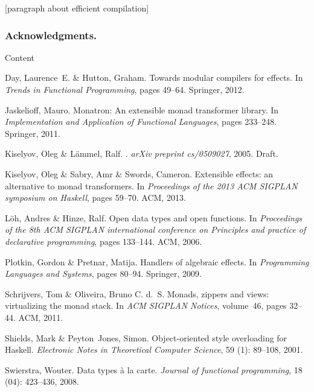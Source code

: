 \documentclass[runningheads,a4paper]{llncs}
\newcommand{\todo}[1]{[{\color{blue}#1}]}
\begin{document}
\todo{paragraph about efficient compilation}

\subsubsection*{Acknowledgments.} Content

\begin{thebibliography}{4}

Day, Laurence~E. \& Hutton, Graham.
\newblock Towards modular compilers for effects.
\newblock In \emph{Trends in Functional Programming}, pages 49--64. Springer,
  2012.

Jaskelioff, Mauro.
\newblock Monatron: An extensible monad transformer library.
\newblock In \emph{Implementation and Application of Functional Languages},
  pages 233--248. Springer, 2011.
  
  Kiselyov, Oleg \& L{\"a}mmel, Ralf.
  .
  \newblock \emph{arXiv preprint cs/0509027}, 2005.
  \newblock Draft.

Kiselyov, Oleg \& Sabry, Amr \& Swords, Cameron.
\newblock Extensible effects: an alternative to monad transformers.
\newblock In \emph{Proceedings of the 2013 ACM SIGPLAN symposium on Haskell},
  pages 59--70. ACM, 2013.

L{\"o}h, Andres \& Hinze, Ralf.
\newblock Open data types and open functions.
\newblock In \emph{Proceedings of the 8th ACM SIGPLAN international conference
  on Principles and practice of declarative programming}, pages 133--144. ACM,
  2006.

Plotkin, Gordon \& Pretnar, Matija.
\newblock Handlers of algebraic effects.
\newblock In \emph{Programming Languages and Systems}, pages 80--94. Springer,
  2009.

Schrijvers, Tom \& Oliveira, Bruno C. d.~S.
\newblock Monads, zippers and views: virtualizing the monad stack.
\newblock In \emph{ACM SIGPLAN Notices}, volume~46, pages 32--44. ACM, 2011.

Shields, Mark \& Peyton~Jones, Simon.
\newblock Object-oriented style overloading for Haskell.
\newblock \emph{Electronic Notes in Theoretical Computer Science}, 59
  (1): 89--108, 2001.

Swierstra, Wouter.
\newblock Data types {\`a} la carte.
\newblock \emph{Journal of functional programming}, 18 (04):
  423--436, 2008.


\end{thebibliography}
\end{document}
